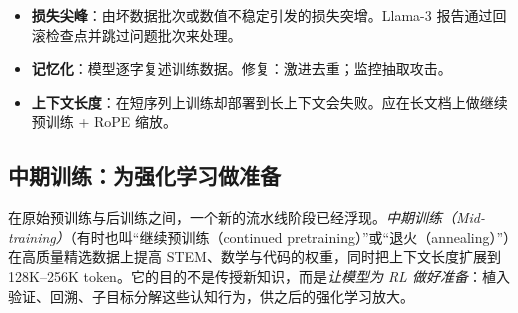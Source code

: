 \begin{warningbox}[预训练陷阱]
\begin{itemize}
  \item \textbf{损失尖峰}：由坏数据批次或数值不稳定引发的损失突增。Llama-3 报告通过回滚检查点并跳过问题批次来处理。
  \item \textbf{记忆化}：模型逐字复述训练数据。修复：激进去重；监控抽取攻击。
  \item \textbf{上下文长度}：在短序列上训练却部署到长上下文会失败。应在长文档上做继续预训练 + RoPE 缩放。
\end{itemize}
\end{warningbox}

\subsection{中期训练：为强化学习做准备}
\label{sec:mid-training}

在原始预训练与后训练之间，一个新的流水线阶段已经浮现。\emph{中期训练（Mid-training）}（有时也叫“继续预训练（continued pretraining）”或“退火（annealing）”）在高质量精选数据上提高 STEM、数学与代码的权重，同时把上下文长度扩展到 128K--256K token。它的目的不是传授新知识，而是\emph{让模型为 RL 做好准备}：植入验证、回溯、子目标分解这些认知行为，供之后的强化学习放大。

